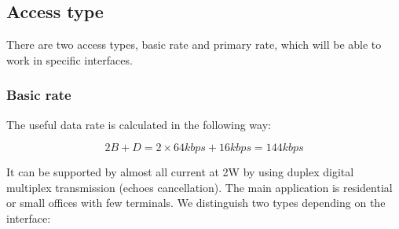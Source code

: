 \documentclass[../main.tex]{subfiles}
\begin{document}
\subsection{Access type}

There are two access types, basic rate and primary rate, which will be able to work in specific interfaces.

\subsubsection{Basic rate}

The useful data rate is calculated in the following way:

$$
	2B + D = 2 \times 64 kbps + 16 kbps = 144 kbps
$$

It can be supported by almost all current at 2W by using duplex digital multiplex transmission (echoes cancellation). The main application is residential or small offices with few terminals. We distinguish two types depending on the interface:
\end{document}
